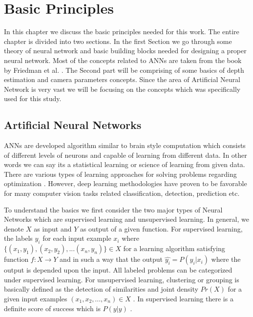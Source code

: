
\chapter{Basic Principles}
\label{Chapter2:Background} 

In this chapter we  discuss the basic  principles needed for this work. The entire chapter is divided into two sections. In the first Section we go through some theory of neural network and basic building blocks  needed for designing a proper neural network. Most of the concepts related to ANNs are taken from the book by Friedman et al. \cite{friedman2001elements}. The Second part will be comprising of some basics of depth estimation and camera parameters concepts. Since the area of Artificial Neural Network is very vast we will be focusing on the concepts which was specifically used for this study. 

\section{Artificial Neural Networks}

ANNs are developed algorithm similar to brain style computation which consists of different levels of neurons and capable of learning from different data. In other words we can say its a statistical learning or science of learning from given data. There are various types of learning approaches for solving problems regarding optimization . However, deep learning methodologies have proven to be favorable for many computer vision tasks related classification, detection, prediction etc.\cite{friedman2001elements} 

To understand the basics we first consider the two major types of Neural Networks which are supervised learning and unsupervised learning. In general, we denote \(X\) as input and \(Y\) as output of a given function. For supervised learning, the labels \(y_{i}\) for each input example \(x_{i}\) where    \(\{(x_{1},y_{1}),(x_{2},y_{2}),...(x_{n},y_{n})\} \in X\) for a learning algorithm satisfying function \(f:X \rightarrow Y\) and in such a way that the output \( \hat{y_{i}} = P (y_{i}|x_{i})\) where the output is depended upon the input. All labeled problems can be categorized under supervised learning. For  unsupervised learning, clustering or grouping is basically defined as the detection of similarities and joint density \(Pr(X)\) for a given input examples \({(x_{1},x_{2},...,x_{n})} \in X\) . In supervised learning there is a definite score of success which is \(P(y|y)\) \cite{friedman2001elements}. 

